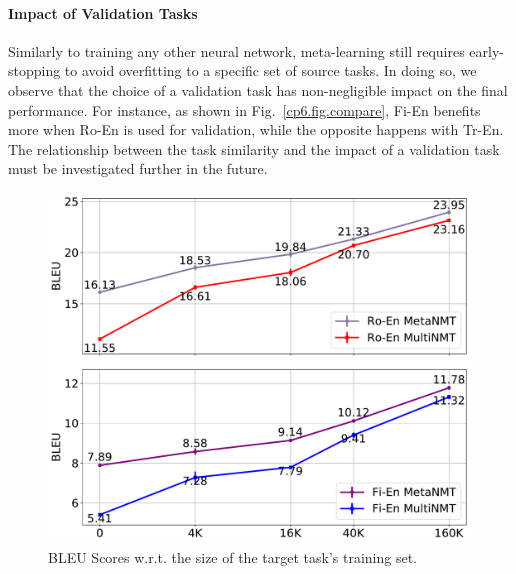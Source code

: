 \paragraph{Impact of Validation Tasks}

Similarly to training any other neural network, meta-learning still requires early-stopping to avoid overfitting to a specific set of source tasks. In doing so, we observe that the choice of a validation task has non-negligible impact on the final performance. For instance, as shown in Fig.~\ref{cp6.fig.compare}, Fi-En benefits more when Ro-En is used for validation, while the opposite happens with Tr-En. The relationship between the task similarity and the impact of a validation task must be investigated further in the future.
\begin{figure}[hptb]
    \centering
    \includegraphics[width=0.8\linewidth]{figs/meta/support_size.pdf}
    \caption{BLEU Scores w.r.t. the size of the target task's training set.}
    \label{cp6.fig.support}
\end{figure}






